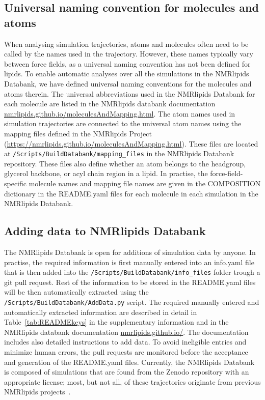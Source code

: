 \documentclass[fleqn,10pt]{wlscirep}
\begin{document}
\subsection{Universal naming convention for molecules and atoms} \label{naming}
When analysing simulation trajectories, atoms and molecules often need to be  called by the names used in the trajectory. However, these names typically vary between force fields, as a universal naming convention has not been defined for lipids. To enable automatic analyses over all the simulations in the NMRlipids Databank, we have defined universal naming conventions for the molecules and atoms therein. The universal abbreviations used in the NMRlipids Databank for each molecule are listed in the NMRlipids databank documentation \href{https://nmrlipids.github.io/moleculesAndMapping.html}{nmrlipids.github.io/moleculesAndMapping.html}.
The atom names used in simulation trajectories are connected to the universal atom names using the mapping files defined in the NMRlipids Project (\url{https://nmrlipids.github.io/moleculesAndMapping.html}). These files are located at \texttt{/Scripts/BuildDatabank/mapping\_files} in the NMRlipids Databank repository. These files also define whether an atom belongs to the headgroup, glycerol backbone, or acyl chain region in a lipid. In practise, the force-field-specific molecule names and mapping file
names are given in the COMPOSITION dictionary in the README.yaml files for each molecule in each simulation in the NMRlipids Databank.

\subsection{Adding data to NMRlipids Databank}
The NMRlipids Databank is open for additions of simulation data by anyone. In practise, the required information is first manually entered into an info.yaml file that is then added into the \texttt{/Scripts/BuildDatabank/info\_files} folder trough a git pull request. Rest of the information to be stored in the README.yaml files will be then automatically extracted using the \texttt{/Scripts/BuildDatabank/AddData.py} script. The required manually entered and automatically extracted information are described in detail in Table~\ref{tab:READMEkeys} in the supplementary information and in the NMRlipids databank documentation \href{https://nmrlipids.github.io/}{nmrlipids.github.io/}. The documentation includes also detailed instructions to add data. To avoid ineligible entries and minimize human errors, the pull requests are monitored before the acceptance and generation of the README.yaml files.  Currently, the NMRlipids Databank is composed of simulations that are found from the Zenodo repository with an appropriate license; most, but not all, of these trajectories originate from previous NMRlipids projects~\cite{botan15,catte16,antila19,bacle21}.
\end{document}
